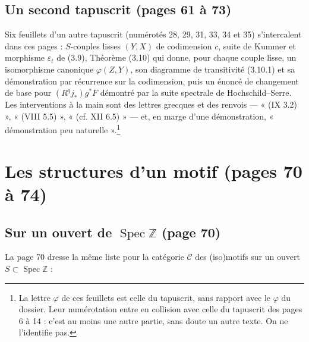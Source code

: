 \documentclass[11pt,a4paper]{article}
\begin{document}
\subsection*{Un second tapuscrit (pages 61 à 73)}

Six feuillets d'un autre tapuscrit (numérotés 28, 29, 31, 33, 34 et 35)
s'intercalent dans ces pages : $S$-couples lisses $(Y, X)$ de codimension
$c$, suite de Kummer et morphisme $\varepsilon_{t}$ de (3.9), Théorème
(3.10) qui donne, pour chaque couple lisse, un isomorphisme canonique
$\varphi(Z, Y)$, son diagramme de transitivité (3.10.1) et sa démonstration
par récurrence sur la codimension, puis un énoncé de changement de base pour
$(R^{q}j_{*})g^{*}F$ démontré par la suite spectrale de Hochschild--Serre.
Les interventions à la main sont des lettres grecques et des renvois
— « (IX 3.2) », « (VIII 5.5) », « (cf. XII 6.5) » — et, en marge d'une
démonstration, « démonstration peu naturelle ».\footnote{La lettre $\varphi$
de ces feuillets est celle du tapuscrit, sans rapport avec le $\varphi$ du
dossier. Leur numérotation entre en collision avec celle du tapuscrit des
pages 6 à 14 : c'est au moins une autre partie, sans doute un autre texte.
On ne l'identifie pas.}

\section*{Les structures d'un motif (pages 70 à 74)}

\subsection*{Sur un ouvert de $\operatorname{Spec}\mathbb{Z}$ (page 70)}

La page 70 dresse la même liste pour la catégorie $\mathscr{C}$ des
(iso)motifs sur un ouvert $S \subset \operatorname{Spec}\mathbb{Z}$ :
\end{document}
